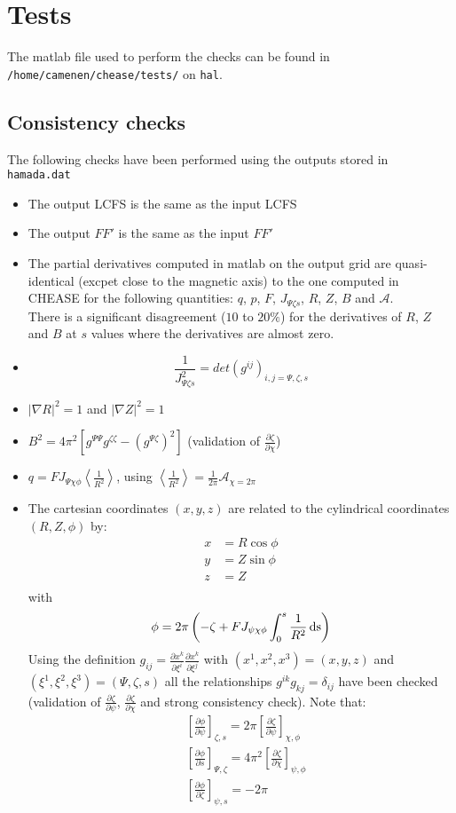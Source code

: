 \documentclass[a4paper,12pt]{article}
\begin{document}
\section{Tests}
The matlab file used to perform the checks can be found in \texttt{/home/camenen/chease/tests/} on \texttt{hal}.
\subsection{Consistency checks}
The following checks have been performed using the outputs stored in \texttt{hamada.dat}
\begin{itemize}
 \item The output LCFS is the same as the input LCFS
 \item The output $FF'$ is the same as the input $FF'$
 \item The partial derivatives computed in matlab on the output grid are quasi-identical (excpet close to the magnetic axis) to the one computed in CHEASE for the following quantities: $q$, $p$, $F$, $J_{\Psi\zeta s}$, $R$, $Z$, $B$ and $\mathcal{A}$.\\
 There is a significant disagreement ($10$ to $20\%$) for the derivatives of $R$, $Z$ and $B$ at $s$ values where the derivatives are almost zero.
 \item $$\frac{1}{J_{\Psi\zeta s}^2}=det\left( g^{ij}\right)_{i,j=\Psi,\zeta,s}$$
 \item $|\nabla R|^2=1$ and $|\nabla Z|^2=1$ 
 \item $B^2=4\pi^2\left[ g^{\Psi\Psi}g^{\zeta\zeta} - (g^{\Psi\zeta})^2\right]$ (validation of $\frac{\partial \zeta}{\partial \chi}$)
 \item $q=F J_{\Psi \chi \phi}\left< \frac{1}{R^2}\right>$, using $\left< \frac{1}{R^2}\right>=\frac{1}{2\pi}\mathcal{A}_{\chi=2\pi}$
 \item The cartesian coordinates $(x,y,z)$ are related to the cylindrical coordinates $(R,Z,\phi)$ by:
\begin{align*}
x&=R\cos\phi\\
y&=Z\sin\phi\\
z&=Z\\
\end{align*}
with $$\phi = 2\pi\left( - \zeta + FJ_{\psi\chi\phi}\int_0^s\frac{1}{R^2}\,\rm{d}s\right)$$
Using the definition $g_{ij}=\frac{\partial x^k}{\partial\xi ^i}\frac{\partial x^k}{\partial\xi ^j}$ with $(x^1,x^2,x^3)=(x,y,z)$ and $(\xi^1,\xi^2,\xi^3)=(\Psi,\zeta,s)$ all the relationships $g^{ik}g_{kj}=\delta_{ij}$ have been checked (validation of $\frac{\partial \zeta}{\partial \psi}$, $\frac{\partial \zeta}{\partial \chi}$ and strong consistency check). Note that:
\begin{align*}
&\left[\frac{\partial \phi}{\partial\psi}\right]_{\zeta, s}=2\pi\left[\frac{\partial \zeta}{\partial\psi}\right]_{\chi, \phi}\\
&\left[\frac{\partial \phi}{\partial s}\right]_{\Psi, \zeta}=4\pi^2\left[\frac{\partial \zeta}{\partial\chi}\right]_{\psi, \phi}\\
&\left[\frac{\partial \phi}{\partial\zeta}\right]_{\psi, s}=-2\pi\\
\end{align*}


\end{itemize}
\end{document}
